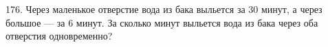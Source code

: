 176. Через маленькое отверстие вода из бака выльется за 30 минут, а через большое --- за 6 минут. За сколько минут выльется вода из бака через оба отверстия одновременно?\\
